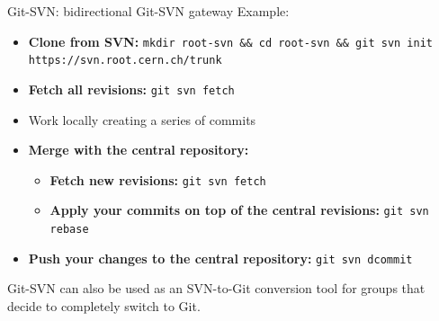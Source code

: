 \documentclass[final,hyperref={pdfpagelabels=false},notitlepage=true]{beamer}
\begin{document}
\begin{frame}{}
\begin{columns}[t]
\begin{column}{0.45\linewidth}
\begin{block}{\large Git-SVN: bidirectional Git-SVN gateway}
          Example:
          \begin{itemize}
            \item {\bf Clone from SVN:} {\tt mkdir root-svn \&\& cd root-svn \&\& git svn init https://svn.root.cern.ch/trunk}
            \item {\bf Fetch all revisions:} {\tt git svn fetch}
            \item Work locally creating a series of commits
            \item {\bf Merge with the central repository:}
              \begin{itemize}
                \item {\bf Fetch new revisions:} {\tt git svn fetch}
                \item {\bf Apply your commits on top of the central revisions:} {\tt git svn rebase}
              \end{itemize}
            \item {\bf Push your changes to the central repository:} {\tt git svn dcommit}
          \end{itemize}

          Git-SVN can also be used as an SVN-to-Git conversion tool
          for groups that decide to completely switch to Git.
	\end{block}


\end{column}
\end{columns}
\end{frame}
\end{document}
